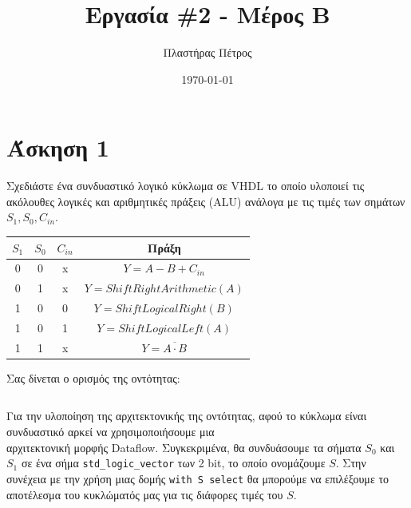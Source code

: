 \documentclass[11pt, a4paper]{report}
\begin{document}
\author{Πλαστήρας Πέτρος}
\title{Εργασία \#2 - Μέρος B}
\date{\today}
\maketitle

\section{Άσκηση 1}
Σχεδιάστε ένα συνδυαστικό λογικό κύκλωμα σε VHDL το οποίο υλοποιεί τις ακόλουθες λογικές και αριθμητικές πράξεις (ALU) ανάλογα με τις τιμές των σημάτων $S_1, S_0, C_{in}$.

\begin{center}
	\begin{tabular}{|c|c|c|c|}
		\hline
		$S_1$ & $S_0$ & $C_{in}$ & Πράξη                           \\
		\hline
		0     & 0     & x        & $Y = A - B + C_{in}$            \\
		0     & 1     & x        & $Y = Shift Right Arithmetic(A)$ \\
		1     & 0     & 0        & $Y = Shift Logical Right(B)$    \\
		1     & 0     & 1        & $Y = Shift Logical Left(A)$     \\
		1     & 1     & x        & $Y = \overline{A \cdot B}$      \\
		\hline
	\end{tabular}
\end{center}

Σας δίνεται ο ορισμός της οντότητας:
\inputminted[firstline=5, lastline=14]{vhdl}{./code/part-2/alu-1/alu.vhdl}

Για την υλοποίηση της αρχιτεκτονικής της οντότητας, αφού το κύκλωμα είναι συνδυαστικό αρκεί να χρησιμοποιήσουμε μια  \\
αρχιτεκτονική μορφής Dataflow. Συγκεκριμένα, θα συνδυάσουμε τα σήματα $S_0$ και $S_1$ σε ένα σήμα \texttt{std_logic_vector} των 2 bit, το οποίο ονομάζουμε $S$.
Στην συνέχεια με την χρήση μιας δομής \texttt{with S select} θα μπορούμε να επιλέξουμε το αποτέλεσμα του κυκλώματός μας για τις διάφορες τιμές του $S$.
\end{document}
